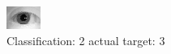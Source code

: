 \begin{figure}[h!]
\begin{center}
\includegraphics[width=0.60\columnwidth]{figures/ID1030_class_2_target_3.png}
\end{center}
\caption{ Classification: 2 actual target: 3}
\label{fig:ID1030_class_2_target_3}
\end{figure}
